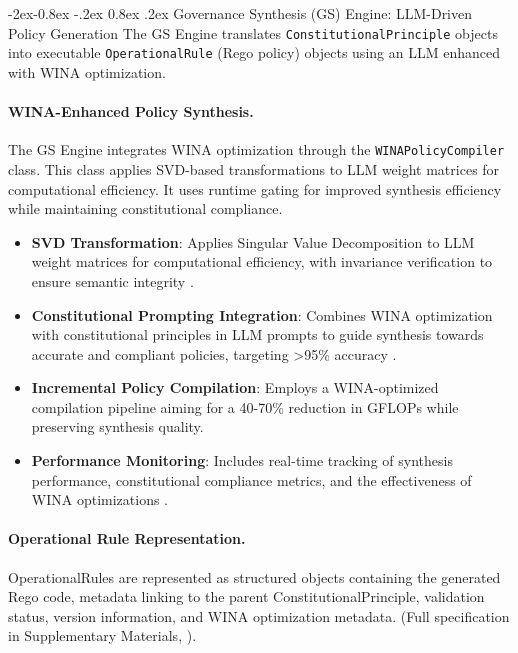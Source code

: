 \documentclass[manuscript,screen,9pt]{acmart}
\makeatletter
\renewcommand\subsubsection{\@startsection{subsubsection}{3}{\z@}%
  {-2ex\@plus -0.8ex \@minus -.2ex}%
  {0.8ex \@plus .2ex}%
  {\normalfont\normalsize\bfseries}}
\makeatother
\begin{document}
\subsubsection{Governance Synthesis (GS) Engine: LLM-Driven Policy Generation}
\label{subsubsec:gs_engine_layer}
The GS Engine translates \texttt{ConstitutionalPrinciple} objects into executable \texttt{OperationalRule} (Rego policy) objects using an LLM enhanced with WINA optimization.

\paragraph{WINA-Enhanced Policy Synthesis.} \sloppy
The GS Engine integrates WINA optimization through the \texttt{WINA\-Policy\-Compiler} class. This class applies SVD-based transformations to LLM weight matrices for computational efficiency. It uses runtime gating for improved synthesis efficiency while maintaining constitutional compliance. \fussy
\begin{itemize}[leftmargin=*,itemsep=1pt,parsep=1pt]
    \item \textbf{SVD Transformation}: Applies Singular Value Decomposition to LLM weight matrices for computational efficiency, with invariance verification to ensure semantic integrity \cite{SVDOptimization2024}.
    \item \textbf{Constitutional Prompting Integration}: Combines WINA optimization with constitutional principles in LLM prompts to guide synthesis towards accurate and compliant policies, targeting >95\% accuracy \cite{ConstitutionalCompliance2024}.
    \item \textbf{Incremental Policy Compilation}: Employs a WINA-optimized compilation pipeline aiming for a 40-70\% reduction in GFLOPs while preserving synthesis quality.
    \item \textbf{Performance Monitoring}: Includes real-time tracking of synthesis performance, constitutional compliance metrics, and the effectiveness of WINA optimizations \cite{PerformanceMonitoring2024}.
\end{itemize}

\paragraph{Operational Rule Representation.} OperationalRules are represented as structured objects containing the generated Rego code, metadata linking to the parent ConstitutionalPrinciple, validation status, version information, and WINA optimization metadata. (Full specification in Supplementary Materials, ).
\end{document}
